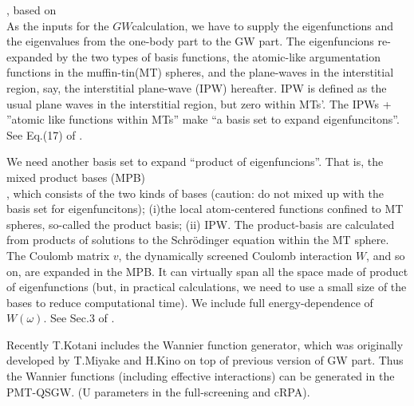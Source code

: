 \documentclass[a4paper,10pt,epsf,fleqn]{article}
\newcommand{\GW}{$GW$}
\begin{document}
, based on \cite{kotani_quasiparticle_2014}\\
As the inputs for the \GW calculation,
we have to supply the eigenfunctions and the eigenvalues
from the one-body part to the GW part. 
The eigenfuncions re-expanded by the two types of basis functions,
the atomic-like argumentation functions in the muffin-tin(MT) spheres,
and the plane-waves in the interstitial region, 
say, the interstitial plane-wave (IPW) hereafter.
IPW is defined as the usual plane waves in the interstitial region, 
but zero within MTs'. The IPWs + ''atomic like functions within MTs'' 
make ``a basis set to expand eigenfuncitons''.
See Eq.(17) of \cite{kotani_quasiparticle_2014}.

We need another basis set to expand ``product of eigenfuncions''. 
That is, the mixed product bases (MPB) \\ \cite{Kotani2002,Friedrich2012},
which consists of the two kinds of bases 
(caution: do not mixed up with the basis set for eigenfuncitons);
(i)the local atom-centered functions confined to MT spheres, so-called
the product basis; (ii) IPW. 
The product-basis are calculated from products of
solutions to the Schr\"odinger equation within the MT sphere.
The Coulomb matrix $v$, the dynamically screened 
Coulomb interaction $W$, and so on, are expanded 
in the MPB. It can virtually span all the space made of product of eigenfunctions
(but, in practical calculations, we need to use a small size of the bases
to reduce computational time).
We include full energy-dependence of $W(\omega)$.
See Sec.3 of \cite{kotani_quasiparticle_2014}.

Recently T.Kotani includes the Wannier function generator, 
which was originally developed by T.Miyake and H.Kino on top of 
previous version of GW part. Thus the Wannier functions (including
effective interactions) can be generated in the PMT-QSGW.
(U parameters in the full-screening and cRPA).
\vspace{3mm}
\end{document}
